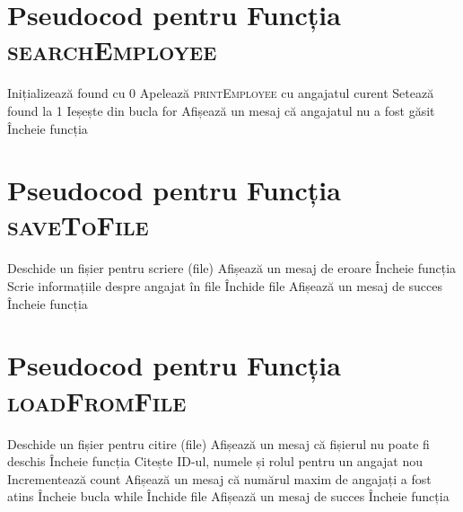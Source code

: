 \documentclass[12pt,a4paper]{article}
\begin{document}
\section*{Pseudocod pentru Funcția \textsc{searchEmployee}}
\begin{algorithm}
\begin{algorithmic}[1]
    \State Inițializează found cu 0
            \State Apelează \textsc{printEmployee} cu angajatul curent
            \State Setează found la 1
            \State Ieșește din bucla for
        \EndIf
    \EndFor
        \State Afișează un mesaj că angajatul nu a fost găsit
    \EndIf
    \State Încheie funcția
\end{algorithmic}
\end{algorithm}

\newpage
\section*{Pseudocod pentru Funcția \textsc{saveToFile}}
\begin{algorithm}
\begin{algorithmic}[1]
    \State Deschide un fișier pentru scriere (file)
        \State Afișează un mesaj de eroare
        \State Încheie funcția
    \EndIf
        \State Scrie informațiile despre angajat în file
    \EndFor
    \State Închide file
    \State Afișează un mesaj de succes
    \State Încheie funcția
\end{algorithmic}
\end{algorithm}

\section*{Pseudocod pentru Funcția \textsc{loadFromFile}}
\begin{algorithm}
\begin{algorithmic}[1]
    \State Deschide un fișier pentru citire (file)
        \State Afișează un mesaj că fișierul nu poate fi deschis
        \State Încheie funcția
    \EndIf
        \State Citește ID-ul, numele și rolul pentru un angajat nou
        \State Incrementează count
            \State Afișează un mesaj că numărul maxim de angajați a fost atins
            \State Încheie bucla while
        \EndIf
    \EndWhile
    \State Închide file
    \State Afișează un mesaj de succes
    \State Încheie funcția
\end{algorithmic}
\end{algorithm}
\end{document}
